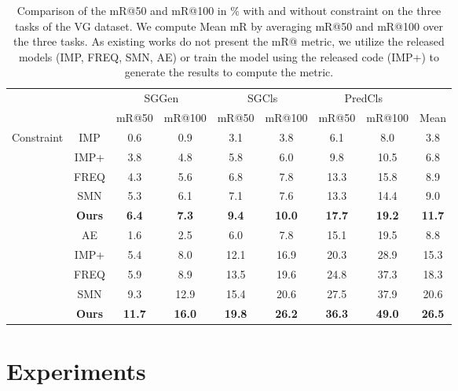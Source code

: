 \documentclass[10pt,twocolumn,letterpaper]{article}
\begin{document}
\begin{table*}[!t]
\centering
\small
\begin{tabular}{c|c|cc|cc|cc|c}
\hline
\multirow{2}{*}{} & \centering \multirow{2}{*}{Method} & \multicolumn{2}{|c|}{SGGen}  & \multicolumn{2}{c|}{SGCls} & \multicolumn{2}{c|}{PredCls}  \\
 & & mR@50 & mR@100   & mR@50 & mR@100 &   mR@50 & mR@100 & Mean  \\
\hline
\hline
\multirow{6}{*}{Constraint} 
& \centering IMP \cite{xu2017scene} &  0.6   & 0.9 &  3.1 & 3.8 & 6.1 & 8.0 & 3.8 \\
& \centering IMP+ \cite{xu2017scene,zellers2017neural} &   3.8 & 4.8 & 5.8 & 6.0 & 9.8 & 10.5 & 6.8 \\
& \centering FREQ \cite{zellers2017neural} & 4.3 & 5.6 & 6.8 & 7.8 & 13.3 & 15.8 & 8.9\\
& \centering SMN \cite{zellers2017neural} & 5.3 & 6.1 & 7.1 & 7.6 & 13.3 & 14.4 & 9.0\\
& \centering \textbf{Ours} & \textbf{6.4} & \textbf{7.3} & \textbf{9.4} & \textbf{10.0} & \textbf{17.7} & \textbf{19.2} & \textbf{11.7}\\
\hline
\multirow{5}{*}{Unconstraint} 
& \centering AE \cite{newell2017pixels} & 1.6 & 2.5 & 6.0 & 7.8 & 15.1 & 19.5 & 8.8 \\
& \centering IMP+ \cite{xu2017scene,zellers2017neural} & 5.4 & 8.0 &  12.1 & 16.9 & 20.3 & 28.9 & 15.3\\
& \centering FREQ \cite{zellers2017neural} & 5.9 & 8.9 & 13.5 & 19.6 & 24.8 & 37.3 & 18.3 \\
& \centering SMN \cite{zellers2017neural} &9.3 & 12.9 & 15.4 & 20.6 & 27.5 & 37.9 & 20.6 \\
& \centering \textbf{Ours}  & \textbf{11.7} & \textbf{16.0} & \textbf{19.8} & \textbf{26.2} & \textbf{36.3} & \textbf{49.0} & \textbf{26.5}\\
\hline
\end{tabular}
\caption{Comparison of the mR@50 and mR@100 in \% with and without constraint on the three tasks of the VG dataset. We compute Mean mR by averaging mR@50 and mR@100 over the three tasks. As existing works do not present the mR@ metric, we utilize the released models (IMP, FREQ, SMN, AE) or train the model using the released code (IMP+) to generate the results to compute the metric.}
\label{table:vg-mrk-sota}
\end{table*}

\section{Experiments}
\end{document}

